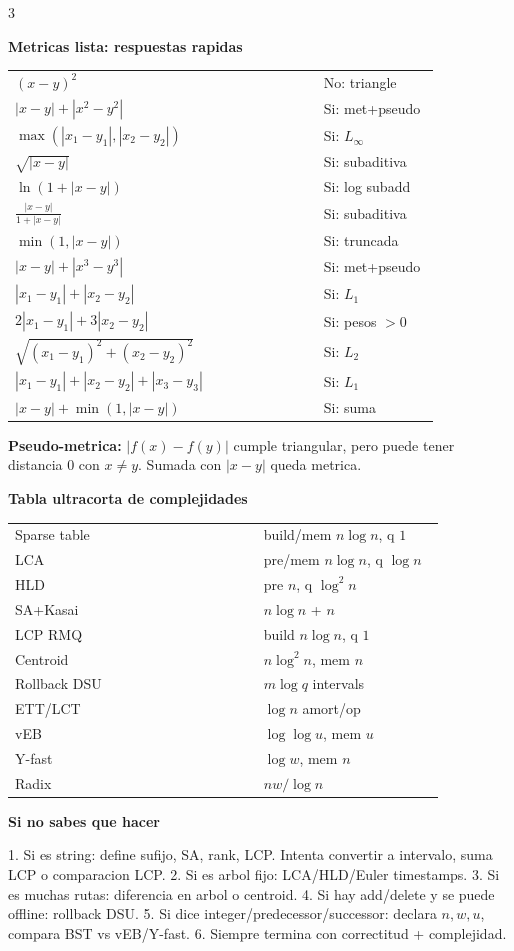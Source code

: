 \documentclass[8pt]{extarticle}
\newcommand{\blk}[2]{%
  \vspace{1.3pt}
  \noindent\colorbox{head}{\parbox{\linewidth-2\fboxsep}{\textbf{#1}}}\par
  {\footnotesize #2}\par
}
\begin{document}
\begin{multicols}{3}
\blk{Metricas lista: respuestas rapidas}{
\begin{tabular}{@{}p{0.69\linewidth}p{0.26\linewidth}@{}}
\((x-y)^2\) & No: triangle\\
\(|x-y|+|x^2-y^2|\) & Si: met+pseudo\\
\(\max(|x_1-y_1|,|x_2-y_2|)\) & Si: \(L_\infty\)\\
\(\sqrt{|x-y|}\) & Si: subaditiva\\
\(\ln(1+|x-y|)\) & Si: log subadd\\
\(\frac{|x-y|}{1+|x-y|}\) & Si: subaditiva\\
\(\min(1,|x-y|)\) & Si: truncada\\
\(|x-y|+|x^3-y^3|\) & Si: met+pseudo\\
\(|x_1-y_1|+|x_2-y_2|\) & Si: \(L_1\)\\
\(2|x_1-y_1|+3|x_2-y_2|\) & Si: pesos \(>0\)\\
\(\sqrt{(x_1-y_1)^2+(x_2-y_2)^2}\) & Si: \(L_2\)\\
\(|x_1-y_1|+|x_2-y_2|+|x_3-y_3|\) & Si: \(L_1\)\\
\(|x-y|+\min(1,|x-y|)\) & Si: suma\\
\end{tabular}
\textbf{Pseudo-metrica:} \(|f(x)-f(y)|\) cumple triangular, pero puede tener distancia 0 con \(x\ne y\). Sumada con \(|x-y|\) queda metrica.}

\blk{Tabla ultracorta de complejidades}{
\begin{tabular}{@{}p{0.55\linewidth}p{0.40\linewidth}@{}}
Sparse table & build/mem \(n\log n\), q \(1\)\\
LCA & pre/mem \(n\log n\), q \(\log n\)\\
HLD & pre \(n\), q \(\log^2 n\)\\
SA+Kasai & \(n\log n\) + \(n\)\\
LCP RMQ & build \(n\log n\), q \(1\)\\
Centroid & \(n\log^2 n\), mem \(n\)\\
Rollback DSU & \(m\log q\) intervals\\
ETT/LCT & \(\log n\) amort/op\\
vEB & \(\log\log u\), mem \(u\)\\
Y-fast & \(\log w\), mem \(n\)\\
Radix & \(n w/\log n\)
\end{tabular}}

\blk{Si no sabes que hacer}{
1. Si es string: define sufijo, SA, rank, LCP. Intenta convertir a intervalo, suma LCP o comparacion LCP.
2. Si es arbol fijo: LCA/HLD/Euler timestamps.
3. Si es muchas rutas: diferencia en arbol o centroid.
4. Si hay add/delete y se puede offline: rollback DSU.
5. Si dice integer/predecessor/successor: declara \(n,w,u\), compara BST vs vEB/Y-fast.
6. Siempre termina con correctitud + complejidad.}


\end{multicols}
\end{document}
